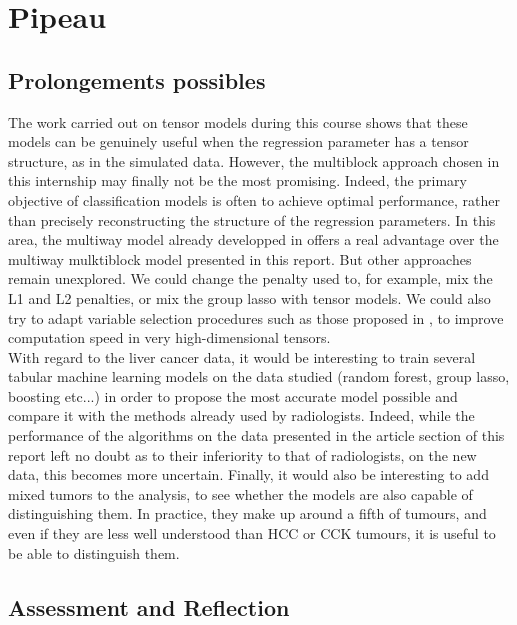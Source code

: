 \documentclass[preprint,12pt]{elsarticle}
\begin{document}
\section{Pipeau}

\subsection{Prolongements possibles}

The work carried out on tensor models during this course shows that these models can be genuinely useful when the regression parameter has a tensor structure, as in the simulated data. However, the multiblock approach chosen in this internship may finally not be the most promising. Indeed, the primary objective of classification models is often to achieve optimal performance, rather than precisely reconstructing the structure of the regression parameters. In this area, the multiway model already developped in \cite{multi_rank_r} offers a real advantage over the multiway mulktiblock model presented in this report. But other approaches remain unexplored. We could change the penalty used to, for example, mix the L1 and L2 penalties, or mix the group lasso with tensor models. We could also try to adapt variable selection procedures such as those proposed in \cite{sis}, to improve computation speed in very high-dimensional tensors.\\
\indent With regard to the liver cancer data, it would be interesting to train several tabular machine learning models on the data studied (random forest, group lasso, boosting etc...) in order to propose the most accurate model possible and compare it with the methods already used by radiologists. Indeed, while the performance of the algorithms on the data presented in the article section of this report left no doubt as to their inferiority to that of radiologists, on the new data, this becomes more uncertain. Finally, it would also be interesting to add mixed tumors to the analysis, to see whether the models are also capable of distinguishing them. In practice, they make up around a fifth of tumours, and even if they are less well understood than HCC or CCK tumours, it is useful to be able to distinguish them.\\

\subsection{Assessment and Reflection}
\end{document}
